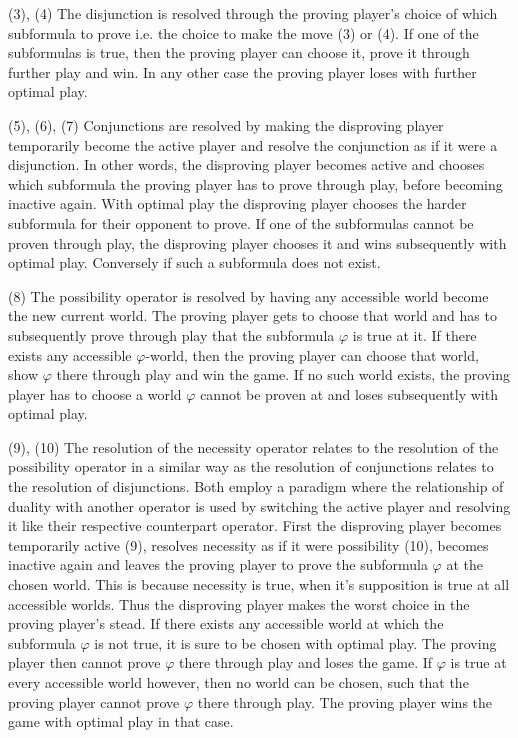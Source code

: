 \documentclass[a4paper,american,10pt]{paper}
\theoremstyle{definition}\newtheorem{lemma}[thm]{Lemma}
\theoremstyle{definition}\newtheorem{proposition}[thm]{Proposition}
\theoremstyle{definition}\newtheorem{corollary}[thm]{Corollary}
\theoremstyle{definition}\newtheorem{definition}{Definition}
\begin{document}
(3), (4) The disjunction is resolved through the proving player's choice of which subformula to prove i.e. the choice to make the move (3) or (4). If one of the subformulas is true, then the proving player can choose it, prove it through further play and win. In any other case the proving player loses with further optimal play.

(5), (6), (7) Conjunctions are resolved by making the disproving player temporarily become the active player and resolve the conjunction as if it were a disjunction. In other words, the disproving player becomes active and chooses which subformula the proving player has to prove through play, before becoming inactive again. With optimal play the disproving player chooses the harder subformula for their opponent to prove. If one of the subformulas cannot be proven through play, the disproving player chooses it and wins subsequently with optimal play. Conversely if such a subformula does not exist.

(8) The possibility operator is resolved by having any accessible world become the new current world. The proving player gets to choose that world and has to subsequently prove through play that the subformula $\varphi$ is true at it. If there exists any accessible $\varphi$-world, then the proving player can choose that world, show $\varphi$ there through play and win the game. If no such world exists, the proving player has to choose a world $\varphi$ cannot be proven at and loses subsequently with optimal play.

(9), (10) The resolution of the necessity operator relates to the resolution of the possibility operator in a similar way as the resolution of conjunctions relates to the resolution of disjunctions. Both employ a paradigm where the relationship of duality with another operator is used by switching the active player and resolving it like their respective counterpart operator. First the disproving player becomes temporarily active (9), resolves necessity as if it were possibility (10), becomes inactive again and leaves the proving player to prove the subformula $\varphi$ at the chosen world. This is because necessity is true, when it's supposition is true at all accessible worlds. Thus the disproving player makes the worst choice in the proving player's stead. If there exists any accessible world at which the subformula $\varphi$ is not true, it is sure to be chosen with optimal play. The proving player then cannot prove $\varphi$ there through play and loses the game. If $\varphi$ is true at every accessible world however, then no world can be chosen, such that the proving player cannot prove $\varphi$ there through play. The proving player wins the game with optimal play in that case.
\end{document}
